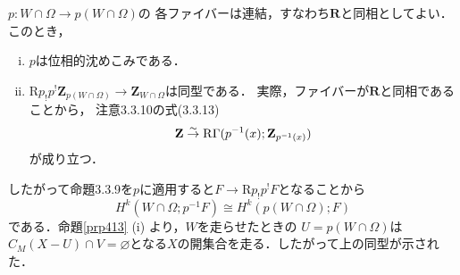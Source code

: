 \documentclass[uplatex,dvipdfmx,a4paper,10pt,draft]{jsarticle}
\makeatletter
\theoremstyle{definition}
\newcommand{\zz}{\mathbf{Z}}
\newcommand{\rr}{\mathbf{R}}
\renewenvironment{proof}[1][\proofname]{\par
  \pushQED{\qed}%
  \normalfont \topsep6\p@\@plus6\p@\relax
  \trivlist
  \item[\hskip\labelsep
         \bfseries
    {#1}]\ignorespaces
}{%
  \popQED\endtrivlist\@endpefalse
}
\renewcommand{\proofname}{証明.}
\numberwithin{equation}{section}
\newcommand{\RG}{\mathop{\mathrm{R}\hspace{-0pt}\Gamma}\nolimits}
\newcommand{\Rder}{\mathrm{R}}
\newcommand{\simar}{\mathrel{\overset{\sim}{\rightarrow}}}%
\theoremstyle{mystyle}
\makeatother
\begin{document}
\begin{proof}
    \(p\colon W\cap\varOmega \to p(W\cap\varOmega)\)の
    各ファイバーは連結，すなわち\(\rr\)と同相としてよい．
    このとき，\begin{enumerate}[(i)]
        \item \(p\)は位相的沈めこみである．
        \item \(
            \Rder{p}_{!}p^{!}\zz_{p(W\cap\varOmega)}
            \to\zz_{W\cap\varOmega}
        \)は同型である．
        実際，ファイバーが\(\rr\)と同相であることから，
        注意3.3.10の式(3.3.13)\[
            \zz\simar\RG(p^{-1}(x);\zz_{p^{-1}(x)})
        \]が成り立つ．
    \end{enumerate}したがって命題3.3.9を\(p\)に適用すると\(
        F\to \Rder{p}_{!}p^{!}F
    \)となることから\[
        H^{k}(W\cap\varOmega;p^{-1}F)
        \cong 
        H^{k}(p(W\cap\varOmega);F)
    \]である．命題\ref{prp413} (i) より，\(W\)を走らせたときの
    \(U=p(W\cap\varOmega)\)は\(
        C_{M}(X-U)\cap V=\varnothing
    \)となる\(X\)の開集合を走る．したがって上の同型が示された．


\end{proof}
\end{document}
